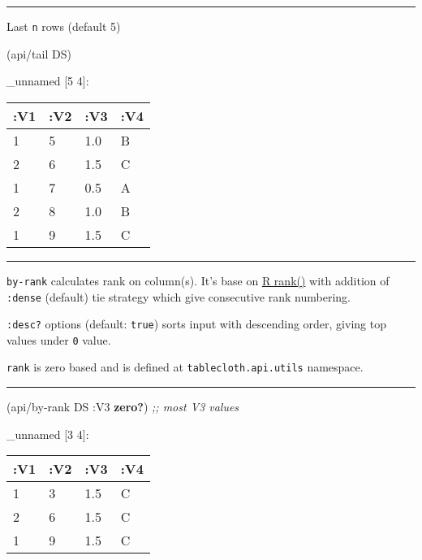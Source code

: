 \documentclass[]{article}
\newenvironment{Shaded}{\begin{snugshade}}{\end{snugshade}}
\newcommand{\AttributeTok}[1]{\textcolor[rgb]{0.77,0.63,0.00}{#1}}
\newcommand{\CommentTok}[1]{\textcolor[rgb]{0.56,0.35,0.01}{\textit{#1}}}
\newcommand{\KeywordTok}[1]{\textcolor[rgb]{0.13,0.29,0.53}{\textbf{#1}}}
\newcommand{\NormalTok}[1]{#1}
\begin{document}
\begin{center}\rule{0.5\linewidth}{0.5pt}\end{center}

Last \texttt{n} rows (default 5)

\begin{Shaded}
\begin{Highlighting}[]
\NormalTok{(api/tail DS)}
\end{Highlighting}
\end{Shaded}

\_unnamed {[}5 4{]}:

\begin{longtable}[]{@{}llll@{}}
\toprule
:V1 & :V2 & :V3 & :V4\tabularnewline
\midrule
\endhead
1 & 5 & 1.0 & B\tabularnewline
2 & 6 & 1.5 & C\tabularnewline
1 & 7 & 0.5 & A\tabularnewline
2 & 8 & 1.0 & B\tabularnewline
1 & 9 & 1.5 & C\tabularnewline
\bottomrule
\end{longtable}

\begin{center}\rule{0.5\linewidth}{0.5pt}\end{center}

\texttt{by-rank} calculates rank on column(s). It's base on
\href{https://www.rdocumentation.org/packages/base/versions/3.6.1/topics/rank}{R
rank()} with addition of \texttt{:dense} (default) tie strategy which
give consecutive rank numbering.

\texttt{:desc?} options (default: \texttt{true}) sorts input with
descending order, giving top values under \texttt{0} value.

\texttt{rank} is zero based and is defined at
\texttt{tablecloth.api.utils} namespace.

\begin{center}\rule{0.5\linewidth}{0.5pt}\end{center}

\begin{Shaded}
\begin{Highlighting}[]
\NormalTok{(api/by-rank DS }\AttributeTok{:V3} \KeywordTok{zero?}\NormalTok{) }\CommentTok{;; most V3 values}
\end{Highlighting}
\end{Shaded}

\_unnamed {[}3 4{]}:

\begin{longtable}[]{@{}llll@{}}
\toprule
:V1 & :V2 & :V3 & :V4\tabularnewline
\midrule
\endhead
1 & 3 & 1.5 & C\tabularnewline
2 & 6 & 1.5 & C\tabularnewline
1 & 9 & 1.5 & C\tabularnewline
\bottomrule
\end{longtable}
\end{document}

